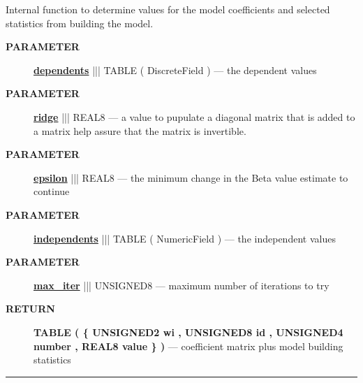 Internal function to determine values for the model coefficients and selected statistics from building the model.






\par
\begin{description}
\item [\colorbox{tagtype}{\color{white} \textbf{\textsf{PARAMETER}}}] \textbf{\underline{dependents}} ||| TABLE ( DiscreteField ) --- the dependent values
\item [\colorbox{tagtype}{\color{white} \textbf{\textsf{PARAMETER}}}] \textbf{\underline{ridge}} ||| REAL8 --- a value to pupulate a diagonal matrix that is added to a matrix help assure that the matrix is invertible.
\item [\colorbox{tagtype}{\color{white} \textbf{\textsf{PARAMETER}}}] \textbf{\underline{epsilon}} ||| REAL8 --- the minimum change in the Beta value estimate to continue
\item [\colorbox{tagtype}{\color{white} \textbf{\textsf{PARAMETER}}}] \textbf{\underline{independents}} ||| TABLE ( NumericField ) --- the independent values
\item [\colorbox{tagtype}{\color{white} \textbf{\textsf{PARAMETER}}}] \textbf{\underline{max\_iter}} ||| UNSIGNED8 --- maximum number of iterations to try
\end{description}







\par
\begin{description}
\item [\colorbox{tagtype}{\color{white} \textbf{\textsf{RETURN}}}] \textbf{TABLE ( \{ UNSIGNED2 wi , UNSIGNED8 id , UNSIGNED4 number , REAL8 value \} )} --- coefficient matrix plus model building statistics
\end{description}




\rule{\linewidth}{0.5pt}

